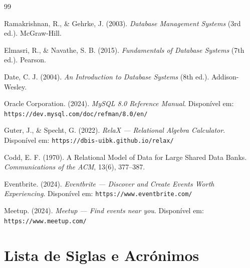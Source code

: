 \documentclass[runningheads]{llncs}
\begin{document}
        \begin{thebibliography}{99}

    Ramakrishnan, R., \& Gehrke, J. (2003).
    \textit{Database Management Systems} (3rd ed.).
    McGraw-Hill.

    Elmasri, R., \& Navathe, S. B. (2015).
    \textit{Fundamentals of Database Systems} (7th ed.).
    Pearson.

    Date, C. J. (2004).
    \textit{An Introduction to Database Systems} (8th ed.).
    Addison-Wesley.

    Oracle Corporation. (2024).
    \textit{MySQL 8.0 Reference Manual}.
    Disponível em: \texttt{https://dev.mysql.com/doc/refman/8.0/en/}

    Guter, J., \& Specht, G. (2022).
    \textit{RelaX --- Relational Algebra Calculator}.
    Disponível em: \texttt{https://dbis-uibk.github.io/relax/}

    Codd, E. F. (1970).
    A Relational Model of Data for Large Shared Data Banks.
    \textit{Communications of the ACM}, 13(6), 377--387.

    Eventbrite. (2024).
    \textit{Eventbrite --- Discover and Create Events Worth Experiencing}.
    Disponível em: \texttt{https://www.eventbrite.com/}

    Meetup. (2024).
    \textit{Meetup --- Find events near you}.
    Disponível em: \texttt{https://www.meetup.com/}

\end{thebibliography}

\newpage
\section{Lista de Siglas e Acrónimos}
\end{document}
